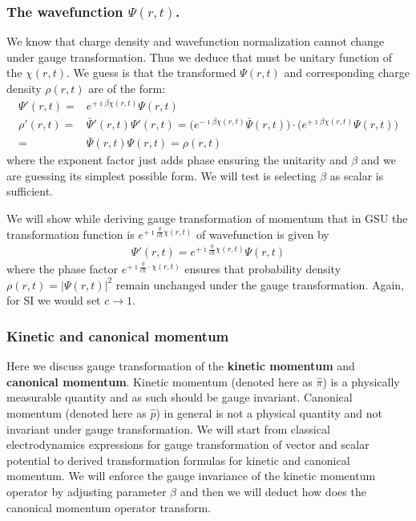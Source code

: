 \documentclass[11pt]{article}
\begin{document}

\subsubsection{The wavefunction $\Psi(r,t)$.}

We know that  charge density and wavefunction normalization cannot change  under gauge transformation. Thus we deduce that  must be  unitary function of the $\chi(r,t)$. We guess is  that the transformed  $\Psi(r,t)$  and corresponding charge density  $\rho(r,t)$ are of the form:
\begin{align*}
    \Psi'(r,t) = & e^{+\imath \beta \chi(r,t) } \Psi(r,t) \\
    \rho'(r,t) = &   \bar \Psi'(r,t) \Psi'(r,t)  =   \big( e^{-\imath \beta \chi(r,t) } \bar \Psi(r,t)\big) \cdot \big(e^{+\imath \beta \chi(r,t) }\Psi(r,t) \big) \\
    =&   \bar \Psi(r,t) \Psi(r,t)  =   \rho(r,t)
\end{align*}
where the exponent factor just adds phase  ensuring the unitarity and $\beta$ and  we are guessing its simplest possible form. We will  test is selecting  $\beta$ as scalar is sufficient.

We will show  while deriving  gauge transformation of momentum that  in GSU  the  transformation function is  $e^{+\imath  \frac{q}{c \hbar} \chi(r,t) }$   of wavefunction is given by
\begin{align*}
    \Psi'(r,t) = e^{+\imath  \frac{q}{c \hbar} \chi(r,t) } \Psi(r,t)
\end{align*}
    where  the phase factor $e^{+\imath  \frac{q}{c \hbar} \cdot \chi(r,t) }$ ensures that  probability density $\rho(r,t)= |\Psi(r,t)|^2$ remain unchanged  under the gauge transformation. Again, for SI we would set $c \to 1$.



\subsubsection{Kinetic and canonical momentum}
Here we discuss gauge transformation of the {\bf kinetic momentum} and   {\bf canonical momentum}.
Kinetic momentum (denoted here as  $\hat  \pi$) is a physically measurable quantity and as such should be gauge invariant. Canonical momentum (denoted here as $\hat p$) in general is not a physical quantity and not invariant under gauge  transformation. 
We will start from   classical electrodynamics  expressions  for gauge transformation of vector and scalar potential to derived  transformation  formulas for kinetic and canonical momentum.  We will enforce the gauge invariance of the kinetic momentum operator  by adjusting parameter $\beta$ and then we will deduct how does the canonical momentum operator transform.
\end{document}
